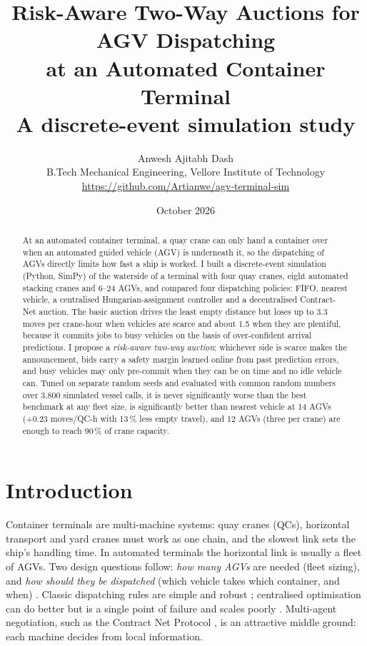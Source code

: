\documentclass[11pt,a4paper]{article}
\title{Risk-Aware Two-Way Auctions for AGV Dispatching\\at an Automated Container Terminal\\[4pt]
\large A discrete-event simulation study}
\author{Anwesh Ajitabh Dash\\\small B.Tech Mechanical Engineering, Vellore Institute of Technology\\
\small \url{https://github.com/Artianwe/agv-terminal-sim}}
\date{October 2026}
\begin{document}
\maketitle

\begin{abstract}
\noindent At an automated container terminal, a quay crane can only hand a container over when an automated
guided vehicle (AGV) is underneath it, so the dispatching of AGVs directly limits how fast a ship is
worked. I built a discrete-event simulation (Python, SimPy) of the waterside of a terminal with four quay
cranes, eight automated stacking cranes and 6--24 AGVs, and compared four dispatching policies: FIFO,
nearest vehicle, a centralised Hungarian-assignment controller and a decentralised Contract-Net auction.
The basic auction drives the least empty distance but loses up to 3.3 moves per crane-hour when vehicles
are scarce and about 1.5 when they are plentiful, because it commits jobs to busy vehicles on the basis of
over-confident arrival predictions. I propose a \emph{risk-aware two-way auction}: whichever side is
scarce makes the announcement, bids carry a safety margin learned online from past prediction errors, and
busy vehicles may only pre-commit when they can be on time and no idle vehicle can. Tuned on separate random
seeds and evaluated with common random numbers over 3,800 simulated vessel calls, it is never
significantly worse than the best benchmark at any fleet size, is significantly better than nearest vehicle at
14 AGVs (+0.23 moves/QC-h with 13\,\% less empty travel), and 12 AGVs (three per crane) are enough to
reach 90\,\% of crane capacity.
\end{abstract}

\section{Introduction}
Container terminals are multi-machine systems: quay cranes (QCs), horizontal transport and yard cranes
must work as one chain, and the slowest link sets the ship's handling time. In automated terminals the
horizontal link is usually a fleet of AGVs. Two design questions follow: \emph{how many AGVs} are needed
(fleet sizing), and \emph{how should they be dispatched} (which vehicle takes which container, and when)
\cite{steenken2004,leanh2006}. Classic dispatching rules are simple and robust \cite{egbelu1984};
centralised optimisation can do better but is a single point of failure and scales poorly
\cite{grunow2004,xin2014}. Multi-agent negotiation, such as the Contract Net Protocol \cite{smith1980},
is an attractive middle ground: each machine decides from local information.
\end{document}
